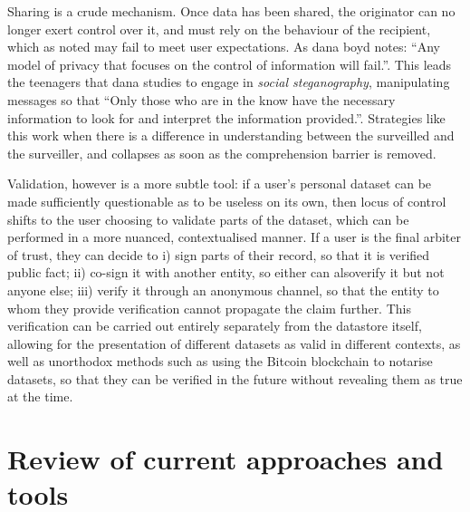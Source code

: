 \documentclass{IOS-Book-Article}     %
\begin{document}
Sharing is a crude mechanism. Once data has been shared, the originator can no
longer exert control over it, and must rely on the behaviour of the recipient,
which as noted may fail to meet user expectations. As dana boyd
notes: ``Any model of privacy that focuses on the control of information will
fail.''. This leads the teenagers that dana studies to
engage in \emph{social steganography}, manipulating messages so that ``Only 
those who are in the know have the necessary information to look for and interpret the information 
provided.''\cite{boyd2012Networked}. Strategies like this work when there is a
difference in understanding between the surveilled and the surveiller, and
collapses as soon as the comprehension barrier is removed.

Validation, however is a more subtle tool:
if a user’s personal dataset can be made sufficiently questionable as to be useless on its own,
then locus of control shifts to the user choosing to validate parts of the dataset,
which can be performed in a more nuanced,
contextualised manner. If a user is the final arbiter of trust, they can decide
to i) sign parts of their record, so that it is verified public fact; ii)
co-sign it with another entity, so either can  alsoverify it but not anyone 
else;
iii) verify it through an anonymous channel, so that the entity to whom they
provide verification cannot propagate the claim further. This verification can
be carried out entirely separately from the datastore itself, allowing for the
presentation of different datasets as valid  in different contexts, as well as
unorthodox methods such as using the Bitcoin blockchain to notarise datasets, so
that they can be verified in the future without revealing them as true at the
time.

\section{Review of current approaches and tools} 
\end{document}
